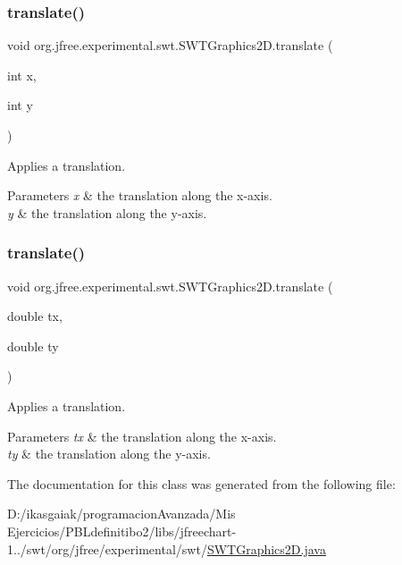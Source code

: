 \subsubsection{\texorpdfstring{translate()}{translate()}\hspace{0.1cm}{\footnotesize\ttfamily [1/2]}}
{\footnotesize\ttfamily void org.\+jfree.\+experimental.\+swt.\+S\+W\+T\+Graphics2\+D.\+translate (\begin{DoxyParamCaption}\item[{int}]{x,  }\item[{int}]{y }\end{DoxyParamCaption})}

Applies a translation.


\begin{DoxyParams}{Parameters}
{\em x} & the translation along the x-\/axis. \\
\hline
{\em y} & the translation along the y-\/axis. \\
\hline
\end{DoxyParams}
\mbox{\label{classorg_1_1jfree_1_1experimental_1_1swt_1_1_s_w_t_graphics2_d_ab7fc89e3d0f7190a653a2a71290900f2}} 
\subsubsection{\texorpdfstring{translate()}{translate()}\hspace{0.1cm}{\footnotesize\ttfamily [2/2]}}
{\footnotesize\ttfamily void org.\+jfree.\+experimental.\+swt.\+S\+W\+T\+Graphics2\+D.\+translate (\begin{DoxyParamCaption}\item[{double}]{tx,  }\item[{double}]{ty }\end{DoxyParamCaption})}

Applies a translation.


\begin{DoxyParams}{Parameters}
{\em tx} & the translation along the x-\/axis. \\
\hline
{\em ty} & the translation along the y-\/axis. \\
\hline
\end{DoxyParams}


The documentation for this class was generated from the following file\+:\begin{DoxyCompactItemize}
\item 
D\+:/ikasgaiak/programacion\+Avanzada/\+Mis Ejercicios/\+P\+B\+Ldefinitibo2/libs/jfreechart-\/1../swt/org/jfree/experimental/swt/\mbox{\hyperlink{_s_w_t_graphics2_d_8java}{S\+W\+T\+Graphics2\+D.\+java}}\end{DoxyCompactItemize}
